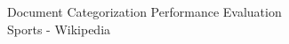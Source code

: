 \documentclass[10pt]{beamer}
\begin{document}
\begin{frame}{Document Categorization Performance Evaluation \\ Sports - Wikipedia }
\begin{columns}[T]
\end{columns}

\end{frame}

\end{document}

